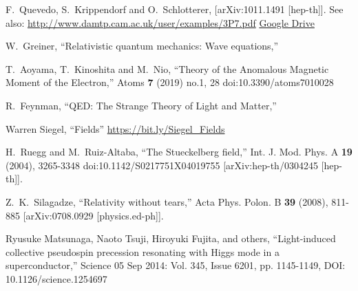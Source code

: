 \begin{thebibliography}{999}
F.~Quevedo, S.~Krippendorf and O.~Schlotterer,
[arXiv:1011.1491 [hep-th]].
See also: \url{http://www.damtp.cam.ac.uk/user/examples/3P7.pdf}
\href{https://drive.google.com/file/d/1HpTXflJToqHr6cEa2b3IkWQ8E1MTjp_v/view?usp=sharing}{Google Drive}

W.~Greiner,
``Relativistic quantum mechanics: Wave equations,''

T.~Aoyama, T.~Kinoshita and M.~Nio,
``Theory of the Anomalous Magnetic Moment of the Electron,''
Atoms \textbf{7} (2019) no.1, 28
doi:10.3390/atoms7010028


R.~Feynman,
``QED: The Strange Theory of Light and Matter,''

  Warren Siegel, ``Fields'' \url{https://bit.ly/Siegel_Fields}

%
H.~Ruegg and M.~Ruiz-Altaba,
``The Stueckelberg field,''
Int. J. Mod. Phys. A \textbf{19} (2004), 3265-3348
doi:10.1142/S0217751X04019755
[arXiv:hep-th/0304245 [hep-th]].

Z.~K.~Silagadze,
``Relativity without tears,''
Acta Phys. Polon. B \textbf{39} (2008), 811-885
[arXiv:0708.0929 [physics.ed-ph]].


Ryusuke Matsunaga, Naoto Tsuji, Hiroyuki Fujita, and others, ``Light-induced collective pseudospin precession resonating with Higgs mode in a superconductor,''
Science  05 Sep 2014:
Vol. 345, Issue 6201, pp. 1145-1149, DOI: 10.1126/science.1254697
\end{thebibliography}




